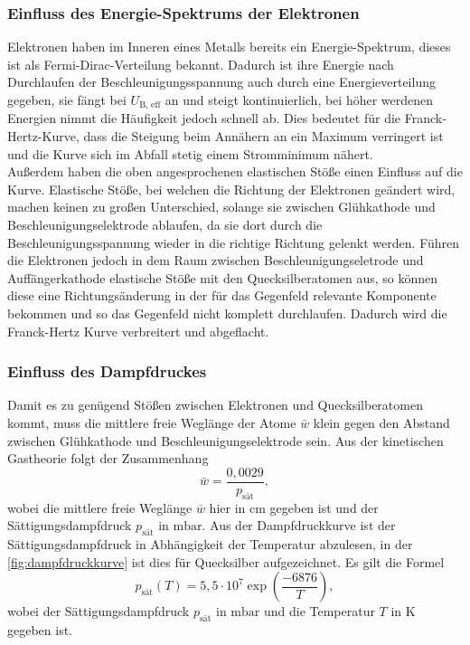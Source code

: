     \subsubsection{Einfluss des Energie-Spektrums der Elektronen}

        Elektronen haben im Inneren eines Metalls bereits ein Energie-Spektrum, dieses ist als Fermi-Dirac-Verteilung bekannt. Dadurch ist ihre Energie nach 
        Durchlaufen der Beschleunigungsspannung auch durch eine Energieverteilung gegeben, sie fängt bei $U_{\text{B, eff}}$ an und steigt kontinuierlich, bei 
        höher werdenen Energien nimmt die Häufigkeit jedoch schnell ab. Dies bedeutet für die Franck-Hertz-Kurve, dass die Steigung beim Annähern an ein Maximum 
        verringert ist und die Kurve sich im Abfall stetig einem Stromminimum nähert. \\

        \noindent Außerdem haben die oben angesprochenen elastischen Stöße einen Einfluss auf die Kurve. Elastische Stöße, bei welchen die Richtung der Elektronen 
        geändert wird, machen keinen zu großen Unterschied, solange sie zwischen Glühkathode und Beschleunigungselektrode ablaufen, da sie dort durch die 
        Beschleunigungsspannung wieder in die richtige Richtung gelenkt werden. Führen die Elektronen jedoch in dem Raum zwischen Beschleunigungseletrode und 
        Auffängerkathode elastische Stöße mit den Quecksilberatomen aus, so können diese eine Richtungsänderung in der für das Gegenfeld relevante Komponente 
        bekommen und so das Gegenfeld nicht komplett durchlaufen. Dadurch wird die Franck-Hertz Kurve verbreitert und abgeflacht. 

    \subsubsection{Einfluss des Dampfdruckes}

        Damit es zu genügend Stößen zwischen Elektronen und Quecksilberatomen kommt, muss die mittlere freie Weglänge der Atome $\bar{w}$ klein gegen den Abstand zwischen 
        Glühkathode und Beschleunigungselektrode sein. Aus der kinetischen Gastheorie folgt der Zusammenhang
        \begin{equation*}
            \bar{w} = \frac{0,0029}{p_{\text{sät}}}, 
        \end{equation*}
        wobei die mittlere freie Weglänge $\bar{w}$ hier in $\si{\centi\metre}$ gegeben ist und der Sättigungsdampfdruck $p_{\text{sät}}$ in $\si{\milli\bar}$. 
        Aus der Dampfdruckkurve ist der Sättigungsdampfdruck in Abhängigkeit der Temperatur abzulesen, in der \autoref{fig:dampfdruckkurve} ist dies für 
        Quecksilber aufgezeichnet. Es gilt die Formel 
        \begin{equation*}
            p_{\text{sät}}(T) = 5,5 \cdot 10^7 \exp(\frac{-6876}{T}), 
        \end{equation*}
        wobei der Sättigungsdampfdruck $p_{\text{sät}}$ in $\si{\milli\bar}$ und die Temperatur $T$ in $\si{\kelvin}$ gegeben ist. 

